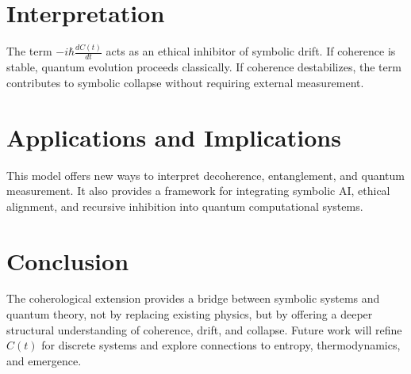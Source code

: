 \documentclass[12pt]{article}
\begin{document}
\section{Interpretation}
The term \( -i\hbar \frac{dC(t)}{dt} \) acts as an ethical inhibitor of symbolic drift. If coherence is stable, quantum evolution proceeds classically. If coherence destabilizes, the term contributes to symbolic collapse without requiring external measurement.

\section{Applications and Implications}
This model offers new ways to interpret decoherence, entanglement, and quantum measurement. It also provides a framework for integrating symbolic AI, ethical alignment, and recursive inhibition into quantum computational systems.

\section{Conclusion}
The coherological extension provides a bridge between symbolic systems and quantum theory, not by replacing existing physics, but by offering a deeper structural understanding of coherence, drift, and collapse. Future work will refine \( C(t) \) for discrete systems and explore connections to entropy, thermodynamics, and emergence.
\end{document}
